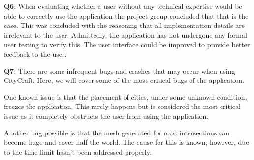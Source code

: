 \textbf{Q6}:
When evaluating whether a user without any technical expertise would be able to correctly use the application the project group concluded that that is the case.
This was concluded with the reasoning that all implementation details are irrelevant to the user.
Admittedly, the application has not undergone any formal user testing to verify this.
The user interface could be improved to provide better feedback to the user.

\textbf{Q7}:
There are some infrequent bugs and crashes that may occur when using CityCraft.
Here, we will cover some of the most critical bugs of the application.

One known issue is that the placement of cities, under some unknown condition, freezes the application.
This rarely happens but is considered the most critical issue as it completely obstructs the user from using the application.

Another bug possible is that the mesh generated for road intersections can become huge and cover half the world.
The cause for this is known, however, due to the time limit hasn't been addressed properly.


